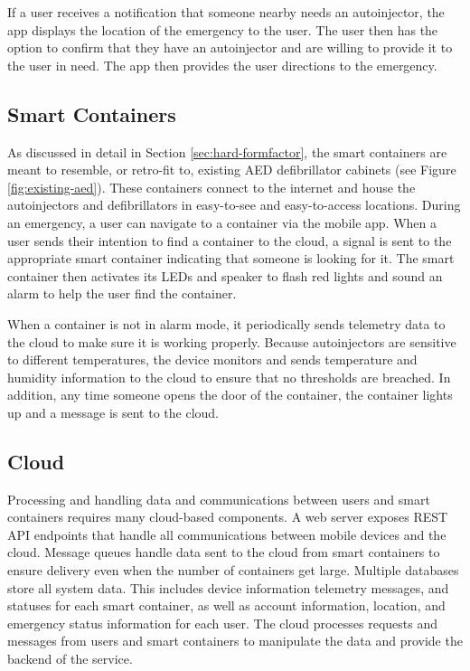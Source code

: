 If a user receives a notification that someone nearby needs an autoinjector, the app displays the location of the emergency to the user. The user then has the option to confirm that they have an autoinjector and are willing to provide it to the user in need. The app then provides the user directions to the emergency.

\subsection{Smart Containers}

As discussed in detail in Section \ref{sec:hard-formfactor}, the smart containers are meant to resemble, or retro-fit to, existing AED defibrillator cabinets (see Figure \ref{fig:existing-aed}). These containers connect to the internet and house the autoinjectors and defibrillators in easy-to-see and easy-to-access locations. During an emergency, a user can navigate to a container via the mobile app. When a user sends their intention to find a container to the cloud, a signal is sent to the appropriate smart container indicating that someone is looking for it. The smart container then activates its LEDs and speaker to flash red lights and sound an alarm to help the user find the container.

When a container is not in alarm mode, it periodically sends telemetry data to the cloud to make sure it is working properly. Because autoinjectors are sensitive to different temperatures, the device monitors and sends temperature and humidity information to the cloud to ensure that no thresholds are breached. In addition, any time someone opens the door of the container, the container lights up and a message is sent to the cloud.

\subsection{Cloud}

Processing and handling data and communications between users and smart containers requires many cloud-based components. A web server exposes REST API endpoints that handle all communications between mobile devices and the cloud. Message queues handle data sent to the cloud from smart containers to ensure delivery even when the number of containers get large. Multiple databases store all system data. This includes device information telemetry messages, and statuses for each smart container, as well as account information, location, and emergency status information for each user. The cloud processes requests and messages from users and smart containers to manipulate the data and provide the backend of the service.


